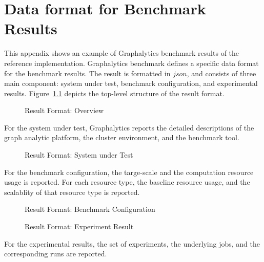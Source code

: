 \chapter{Data format for Benchmark Results}
\label{chap:data-format}
This appendix shows an example of Graphalytics benchmark results of the reference implementation. Graphalytics benchmark defines a specific data format for the benchmark results. The result is formatted in $json$, and consists of three main component: system under test, benchmark configuration, and experimental results. Figure~\ref{fig:result-format:overview} depicts the top-level structure of the result format.

\begin{figure}[h]
	\centering
	\caption{Result Format: Overview}
	\label{fig:result-format:overview}
\end{figure}

For the system under test, Graphalytics reports the detailed descriptions of the graph analytic platform, the cluster environment, and the benchmark tool.

\begin{figure}[!h]
	\centering
	\caption{Result Format: System under Test}
	\label{fig:result-format:system}
\end{figure}

For the benchmark configuration, the targe-scale and the computation resource usage is reported. For each resource type, the baseline resource usage, and the scalablity of that resource type is reported.

\begin{figure}[!h]
	\centering
	\caption{Result Format: Benchmark Configuration}
	\label{fig:result-format:conf}
\end{figure}

\begin{figure}[!h]
	\centering
	\caption{Result Format: Experiment Result}
	\label{fig:result-format:result}
\end{figure}

For the experimental results, the set of experiments, the underlying jobs, and the corresponding runs are reported.
